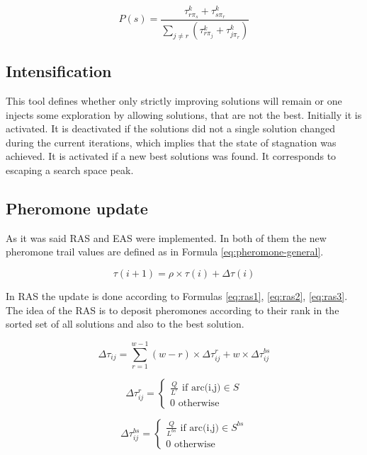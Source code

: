 \documentclass[12pt]{article}
\begin{document}
\begin{equation}
P(s) = \frac{\tau_{r\pi_s}^k + \tau_{s\pi_r}^k}{\sum_{j \ne r} (\tau_{r\pi_j}^k + \tau_{j\pi_r}^k)}
\label{eq:explorative}
\end{equation}

\subsection{Intensification}

This tool defines whether only strictly improving solutions will remain or one injects some exploration by allowing solutions, that are not the best. Initially it is activated. It is deactivated if the solutions did not a single solution changed during the current iterations, which implies that the state of stagnation was achieved. It is activated if a new best solutions was found. It corresponds to escaping a search space peak.

\subsection{Pheromone update}

As it was said RAS and EAS were implemented. In both of them the new pheromone trail values are defined as in Formula \ref{eq:pheromone-general}.

\begin{equation}
\tau(i+1) = \rho \times \tau(i) + \Delta\tau(i)
\label{eq:pheromone-general}
\end{equation}

In RAS the update is done according to Formulas \ref{eq:ras1}, \ref{eq:ras2}, \ref{eq:ras3}. The idea of the RAS is to deposit pheromones according to their rank in the sorted set of all solutions and also to the best solution.

\begin{equation}
\Delta\tau_{ij} = \sum_{r=1}^{w-1} (w-r) \times \Delta \tau_{ij}^r + w \times \Delta \tau_{ij}^{bs}
\label{eq:ras1}
\end{equation}

\begin{equation}
\Delta\tau_{ij}^r = \begin{cases}
    \frac{Q}{L^r} \text{ if arc(i,j)} \in S\\
    0 \text{ otherwise}
  \end{cases}
\label{eq:ras2}
\end{equation}

\begin{equation}
\Delta\tau_{ij}^{bs} = \begin{cases}
    \frac{Q}{L^{bs}} \text{ if arc(i,j)} \in S^{bs}\\
    0 \text{ otherwise}
  \end{cases}
\label{eq:ras3}
\end{equation}
\end{document}

